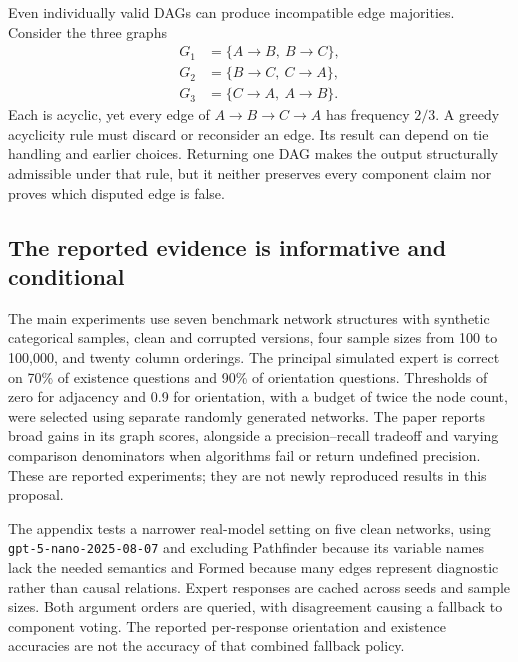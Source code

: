 Even individually valid DAGs can produce incompatible edge majorities. Consider
the three graphs
\begin{equation}
 \begin{split}
 G_1&=\{A\rightarrow B,\ B\rightarrow C\},\\
 G_2&=\{B\rightarrow C,\ C\rightarrow A\},\\
 G_3&=\{C\rightarrow A,\ A\rightarrow B\}.
 \end{split}
 \label{exec20:expert-cycle}
\end{equation}
Each is acyclic, yet every edge of $A\rightarrow B\rightarrow C\rightarrow A$
has frequency $2/3$. A greedy acyclicity rule must discard or reconsider an
edge. Its result can depend on tie handling and earlier choices. Returning one
DAG makes the output structurally admissible under that rule, but it neither
preserves every component claim nor proves which disputed edge is false.
\citep{exec20_expert_averaging_reference}

\subsection{The reported evidence is informative and conditional}
\label{exec20:expert-evidence}

The main experiments use seven benchmark network structures with synthetic
categorical samples, clean and corrupted versions, four sample sizes from 100
to 100,000, and twenty column orderings. The principal simulated expert is
correct on 70\% of existence questions and 90\% of orientation questions.
Thresholds of zero for adjacency and 0.9 for orientation, with a budget of twice
the node count, were selected using separate randomly generated networks. The
paper reports broad gains in its graph scores, alongside a precision--recall
tradeoff and varying comparison denominators when algorithms fail or return
undefined precision. These are reported experiments; they are not newly
reproduced results in this proposal. \citep{exec20_expert_averaging}

The appendix tests a narrower real-model setting on five clean networks,
using \texttt{gpt-5-nano-}\allowbreak\texttt{2025-08-07} and excluding Pathfinder
because its variable names lack the needed semantics and Formed because many
edges represent diagnostic rather than causal relations. Expert responses are
cached across seeds and sample sizes. Both argument orders are queried, with
disagreement causing a fallback to component voting. The reported per-response
orientation and existence accuracies are not the accuracy of that combined
fallback policy. \citep{exec20_expert_averaging}

